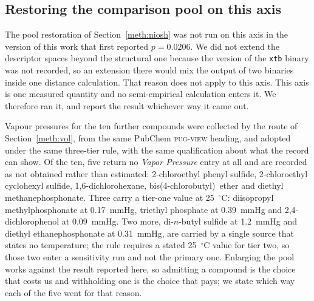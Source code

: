 \documentclass[11pt,a4paper]{article}
\begin{document}


\begin{table}[htb]
  \centering
  \caption{Nearest incumbent simulant and nearest compound of the non-agent pool
  for each agent on the volatility axis. $\Delta$ is the gap in
  $\log_{10}(P/\mathrm{mmHg})$. Where the last two columns name the same
  compound, a simulant is the nearest of the pool; where they differ, an
  interferent is.}
  \label{tab:vpairing}
  \small

\end{table}

\subsection{Restoring the comparison pool on this axis}
\label{meth:volniosh}

The pool restoration of Section~\ref{meth:niosh} was not run on this axis in
the version of this work that first reported $p = 0.0206$. We did not extend the
descriptor spaces beyond the structural one because the version of the
\texttt{xtb} binary was not recorded, so an extension there would mix the
output of two binaries inside one distance calculation. That reason does not
apply to this axis. This axis is one measured quantity and no semi-empirical calculation
enters it. We therefore ran it, and report the result whichever way it came
out.

Vapour pressures for the ten further compounds were collected by the route of
Section~\ref{meth:vol}, from the same PubChem \textsc{pug-view} heading, and
adopted under the same three-tier rule, with the same qualification about
what the record can show. Of the
ten, five return no \textit{Vapor Pressure} entry at all and are recorded as
not obtained rather than estimated: 2-chloroethyl phenyl sulfide,
2-chloroethyl cyclohexyl sulfide, 1,6-dichlorohexane,
bis(4-chlorobutyl)~ether and diethyl methanephosphonate. Three carry a
tier-one value at 25~$^{\circ}$C: diisopropyl methylphosphonate at
0.17~mmHg, triethyl phosphate at 0.39~mmHg and 2,4-dichlorophenol at
0.09~mmHg. Two more, di-$n$-butyl sulfide at 1.2~mmHg and diethyl
ethanephosphonate at 0.31~mmHg, are carried by a single source that states no
temperature; the rule requires a stated 25~$^{\circ}$C value for tier two, so
those two enter a sensitivity run and not the primary one. Enlarging the pool
works against the result reported here, so admitting a compound is the choice
that costs us and withholding one is the choice that pays; we state which way
each of the five went for that reason.
\end{document}
